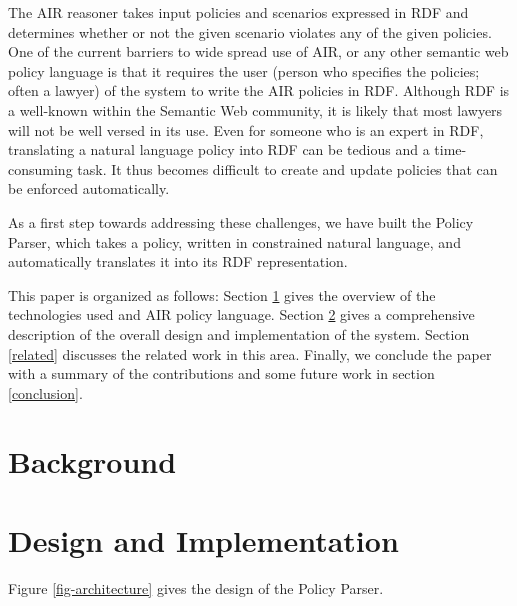 \documentclass{llncs}
\begin{document}
The AIR reasoner\cite{air} takes input policies and scenarios expressed in RDF and determines whether or not the given scenario violates any of the given policies. One of the current barriers to wide spread use of AIR, or any other semantic web policy language is that it requires the user (person who specifies the policies; often a lawyer) of the system to write the AIR policies in RDF. Although RDF is a well-known within the Semantic Web community, it is likely that most lawyers will not be well versed in its use. Even for someone who is an expert in RDF, translating a natural language policy into RDF can be tedious and a time-consuming task. It thus becomes difficult to create and update policies that can be enforced automatically.

As a first step towards addressing these challenges, we have built the Policy Parser, which takes a policy, written in constrained natural language, and automatically translates it into its RDF representation.

This paper is organized as follows:
Section \ref{background} gives the overview of the technologies used and AIR policy language.  
Section \ref{design} gives a comprehensive description of the overall design and implementation of the system.
Section \ref{related} discusses the related work in this area.
Finally, we conclude the paper with a summary of the contributions and some future work in section \ref{conclusion}.



\section{Background} \label{background}



\section{Design and Implementation} \label{design}

Figure \ref{fig-architecture} gives the design of the Policy Parser.
\end{document}
